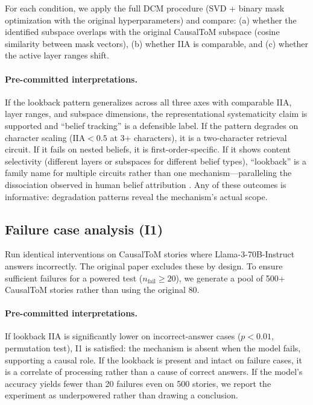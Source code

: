 \documentclass[11pt]{article}
\begin{document}
For each condition, we apply the full DCM procedure (SVD + binary mask optimization with the original hyperparameters) and compare: (a) whether the identified subspace overlaps with the original CausalToM subspace (cosine similarity between mask vectors), (b) whether IIA is comparable, and (c) whether the active layer ranges shift.

\paragraph{Pre-committed interpretations.} If the lookback pattern generalizes across all three axes with comparable IIA, layer ranges, and subspace dimensions, the representational systematicity claim is supported and ``belief tracking'' is a defensible label. If the pattern degrades on character scaling ($\text{IIA} < 0.5$ at 3+ characters), it is a two-character retrieval circuit. If it fails on nested beliefs, it is first-order-specific. If it shows content selectivity (different layers or subspaces for different belief types), ``lookback'' is a family name for multiple circuits rather than one mechanism---paralleling the dissociation observed in human belief attribution \citep{apperly2009humans}. Any of these outcomes is informative: degradation patterns reveal the mechanism's actual scope.

\subsection{Failure case analysis (I1)}
\label{sec:failure}

Run identical interventions on CausalToM stories where Llama-3-70B-Instruct answers incorrectly. The original paper excludes these by design. To ensure sufficient failures for a powered test ($n_{\text{fail}} \geq 20$), we generate a pool of 500+ CausalToM stories rather than using the original 80.

\paragraph{Pre-committed interpretations.} If lookback IIA is significantly lower on incorrect-answer cases ($p < 0.01$, permutation test), I1 is satisfied: the mechanism is absent when the model fails, supporting a causal role. If the lookback is present and intact on failure cases, it is a correlate of processing rather than a cause of correct answers. If the model's accuracy yields fewer than 20 failures even on 500 stories, we report the experiment as underpowered rather than drawing a conclusion.
\end{document}
